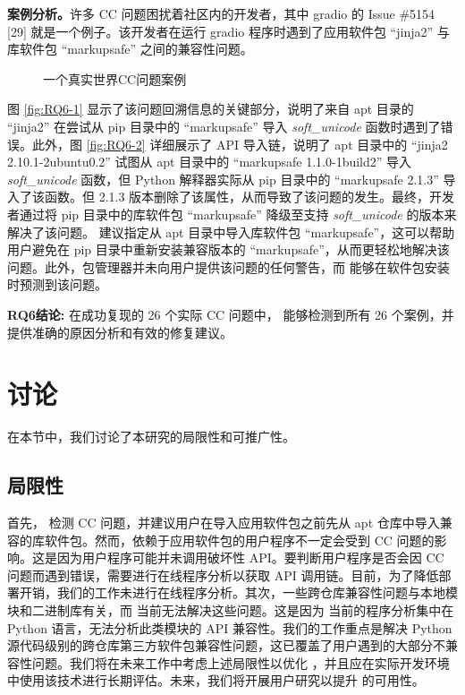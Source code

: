\textbf{案例分析。}许多 CC 问题困扰着社区内的开发者，其中 gradio 的 Issue \#5154 [29] 就是一个例子。该开发者在运行 gradio 程序时遇到了应用软件包 “jinja2” 与库软件包 “markupsafe” 之间的兼容性问题。
\begin{figure}[htbp]
	\centering
	\hspace{4em}
	\caption{一个真实世界CC问题案例}
	\label{fig:RQ6}
\end{figure}
图 \ref{fig:RQ6-1}  显示了该问题回溯信息的关键部分，说明了来自 apt 目录的 “jinja2” 在尝试从 pip 目录中的 “markupsafe” 导入 \textit{soft\_unicode} 函数时遇到了错误。此外，图 \ref{fig:RQ6-2} 详细展示了 API 导入链，说明了 apt 目录中的 “jinja2 2.10.1-2ubuntu0.2” 试图从 apt 目录中的 “markupsafe 1.1.0-1build2” 导入 \textit{soft\_unicode} 函数，但 Python 解释器实际从 pip 目录中的 “markupsafe 2.1.3” 导入了该函数。但 2.1.3 版本删除了该属性，从而导致了该问题的发生。最终，开发者通过将 pip 目录中的库软件包 “markupsafe” 降级至支持 \textit{soft\_unicode} 的版本来解决了该问题。\tool{} 建议指定从 apt 目录中导入库软件包 “markupsafe”，这可以帮助用户避免在 pip 目录中重新安装兼容版本的 “markupsafe”，从而更轻松地解决该问题。此外，包管理器并未向用户提供该问题的任何警告，而 \tool{} 能够在软件包安装时预测到该问题。

\begin{tcolorbox}[boxrule=1pt,boxsep=1pt,left=2pt,right=2pt,top=2pt,bottom=2pt]
	\small
	\textcolor{red}{} \noindent\textbf{RQ6结论:} 
	在成功复现的 26 个实际 CC 问题中，\tool{} 能够检测到所有 26 个案例，并提供准确的原因分析和有效的修复建议。
\end{tcolorbox} 

\section{讨论}
在本节中，我们讨论了本研究的局限性和可推广性。
\subsection{局限性}
首先，\tool{} 检测 CC 问题，并建议用户在导入应用软件包之前先从 apt 仓库中导入兼容的库软件包。然而，依赖于应用软件包的用户程序不一定会受到 CC 问题的影响。这是因为用户程序可能并未调用破坏性 API。要判断用户程序是否会因 CC 问题而遇到错误，需要进行在线程序分析以获取 API 调用链。目前，为了降低部署开销，我们的工作未进行在线程序分析。其次，一些跨仓库兼容性问题与本地模块和二进制库有关，而 \tool{} 当前无法解决这些问题。这是因为 \tool{} 当前的程序分析集中在 Python 语言，无法分析此类模块的 API 兼容性。我们的工作重点是解决 Python 源代码级别的跨仓库第三方软件包兼容性问题，这已覆盖了用户遇到的大部分不兼容性问题。我们将在未来工作中考虑上述局限性以优化 \tool{}，并且应在实际开发环境中使用该技术进行长期评估。未来，我们将开展用户研究以提升 \tool{} 的可用性。
